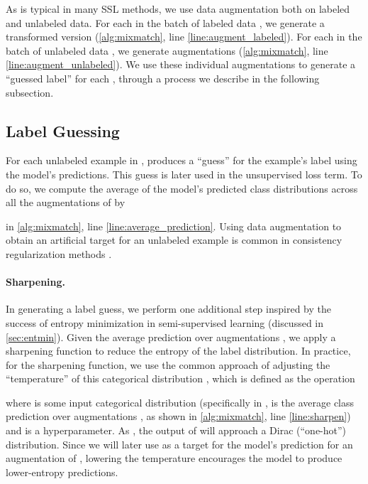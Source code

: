 \documentclass{article}
\begin{document}
As is typical in many SSL methods, we use data augmentation both on labeled and unlabeled data.
For each  in the batch of labeled data , we generate a transformed version  (\cref{alg:mixmatch}, line \ref{line:augment_labeled}).
For each  in the batch of unlabeled data , we generate  augmentations  (\cref{alg:mixmatch}, line \ref{line:augment_unlabeled}).
We use these individual augmentations to generate a ``guessed label''  for each , through a process we describe in the following subsection.

\subsection{Label Guessing}
\label{sec:label_guessing}

For each unlabeled example in ,  produces a ``guess'' for the example's label using the model's predictions.
This guess is later used in the unsupervised loss term.
To do so, we compute the average of the model's predicted class distributions across all the  augmentations of  by

in \cref{alg:mixmatch}, line \ref{line:average_prediction}.
Using data augmentation to obtain an artificial target for an unlabeled example is common in consistency regularization methods \cite{laine2016temporal,sajjadi2016regularization,tarvainen2017weight}.

\paragraph{Sharpening.} In generating a label guess, we perform one additional step inspired by the success of entropy minimization in semi-supervised learning (discussed in \cref{sec:entmin}).
Given the average prediction over augmentations , we apply a sharpening function to reduce the entropy of the label distribution.
In practice, for the sharpening function, we use the common approach of adjusting the ``temperature'' of this categorical distribution \cite{goodfellow2016deep}, which is defined as the operation

where  is some input categorical distribution (specifically in ,  is the average class prediction over augmentations , as shown in \cref{alg:mixmatch}, line \ref{line:sharpen}) and  is a hyperparameter.
As , the output of  will approach a Dirac (``one-hot'') distribution.
Since we will later use  as a target for the model's prediction for an augmentation of , lowering the temperature encourages the model to produce lower-entropy predictions.
\end{document}
